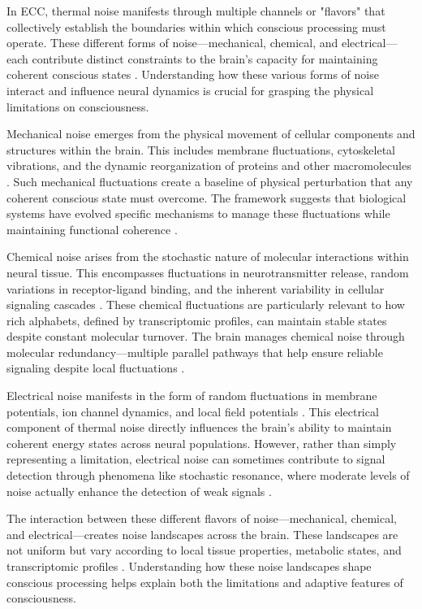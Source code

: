 In ECC, thermal noise manifests through multiple channels or "flavors" that collectively establish the boundaries within which conscious processing must operate. These different forms of noise—mechanical, chemical, and electrical—each contribute distinct constraints to the brain's capacity for maintaining coherent conscious states \cite{faisal2008}. Understanding how these various forms of noise interact and influence neural dynamics is crucial for grasping the physical limitations on consciousness.

Mechanical noise emerges from the physical movement of cellular components and structures within the brain. This includes membrane fluctuations, cytoskeletal vibrations, and the dynamic reorganization of proteins and other macromolecules \cite{bialek2012}. Such mechanical fluctuations create a baseline of physical perturbation that any coherent conscious state must overcome. The framework suggests that biological systems have evolved specific mechanisms to manage these fluctuations while maintaining functional coherence \cite{niven2008}.

Chemical noise arises from the stochastic nature of molecular interactions within neural tissue. This encompasses fluctuations in neurotransmitter release, random variations in receptor-ligand binding, and the inherent variability in cellular signaling cascades \cite{attwell2001}. These chemical fluctuations are particularly relevant to how rich alphabets, defined by transcriptomic profiles, can maintain stable states despite constant molecular turnover. The brain manages chemical noise through molecular redundancy—multiple parallel pathways that help ensure reliable signaling despite local fluctuations \cite{harris2012}.

Electrical noise manifests in the form of random fluctuations in membrane potentials, ion channel dynamics, and local field potentials \cite{vanderziel1988}. This electrical component of thermal noise directly influences the brain's ability to maintain coherent energy states across neural populations. However, rather than simply representing a limitation, electrical noise can sometimes contribute to signal detection through phenomena like stochastic resonance, where moderate levels of noise actually enhance the detection of weak signals \cite{gammaitoni1998}.

The interaction between these different flavors of noise—mechanical, chemical, and electrical—creates noise landscapes across the brain. These landscapes are not uniform but vary according to local tissue properties, metabolic states, and transcriptomic profiles \cite{laughlin2001}. Understanding how these noise landscapes shape conscious processing helps explain both the limitations and adaptive features of consciousness.

